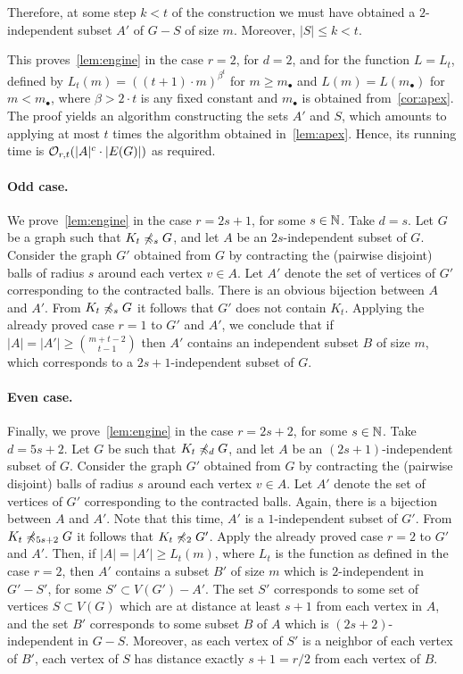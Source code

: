  Therefore, at some step $k<t$ of the construction we must have obtained a $2$-independent subset $A'$ of $G-S$ of size $m$. Moreover, $|S|\le k<t$.
 
 
 
 This proves~\cref{lem:engine} in the case $r=2$, for $d=2$, and for the function $L=L_t$, defined by $L_t(m)=((t+1)\cdot m)^{\beta^t}$
 for $m\ge m_\bullet$ and $L(m)=L(m_\bullet)$ for $m<m_\bullet$, where $\beta>2\cdot t$ is any fixed constant and $m_\bullet$ is obtained from~\cref{cor:apex}.
 The proof yields an algorithm constructing the sets $A'$ and $S$,
 which amounts to applying at most $t$ times the algorithm obtained in~\cref{lem:apex}.
 Hence, its running time  is $\mathcal{O}_{r,t}(|A|^c\cdot |E(G)|)$ as required.


\paragraph{Odd case.}
We prove~\cref{lem:engine} in the case $r=2s+1$, for some $s\in \mathbb{N}$. Take $d=s$.
Let $G$ be a graph such that $K_t\not\preccurlyeq_s G$, and 
 let $A$ be an $2s$-independent subset of $G$. Consider the graph $G'$ obtained from $G$
by contracting the (pairwise disjoint) balls of radius $s$ around each vertex $v\in A$.
 Let $A'$ denote the set of vertices of $G'$ corresponding to the contracted balls. There is an obvious bijection between $A$ and $A'$.
From $K_t\not\preccurlyeq_s G$ it follows that $G'$ does not contain $K_t$. Applying the already proved case $r=1$ to $G'$ and $A'$, we conclude that 
if $|A|=|A'|\ge {m+t-2\choose t-1}$ then
 $A'$ contains an independent subset $B$ of size $m$,
 which corresponds to a $2s+1$-independent subset of $G$.
 
 
 \paragraph{Even case.}
 Finally,
 we prove~\cref{lem:engine} in the case $r=2s+2$, for some $s\in \mathbb{N}$.  Take  $d=5s+2$.
Let $G$  be such that 
 $K_t\not\preccurlyeq_{d} G$, and
let $A$ be an $(2s+1)$-independent subset of $G$. Consider the graph $G'$ obtained from $G$
by contracting the (pairwise disjoint) balls of radius $s$ around each vertex $v\in A$.
 Let $A'$ denote the set of vertices of $G'$ corresponding to the contracted balls. Again, there is a bijection between $A$ and $A'$. Note that
this time, $A'$ is a $1$-independent subset of $G'$.
From $K_t\not\preccurlyeq_{5s+2} G$ it follows that $K_t\not\preccurlyeq_2 G'$. Apply the already proved case $r=2$ to $G'$ and $A'$. Then, if $|A|=|A'|\ge L_t(m)$, where $L_t$ is the function as defined in the case $r=2$, then
 $A'$ contains a subset $B'$ of size $m$
which is  $2$-independent in $G'-S'$, for some $S'\subset V(G')-A'$.
The set $S'$ corresponds to some set of vertices $S\subset V(G)$
which are at distance at least $s+1$ from each vertex in $A$,
and the set  $B'$ corresponds to some subset $B$ of $A$
which is $(2s+2)$-independent in $G-S$. Moreover, as each vertex of $S'$
is a neighbor of each vertex of $B'$,  each vertex of $S$
has distance exactly $s+1=r/2$ from each vertex of $B$.

